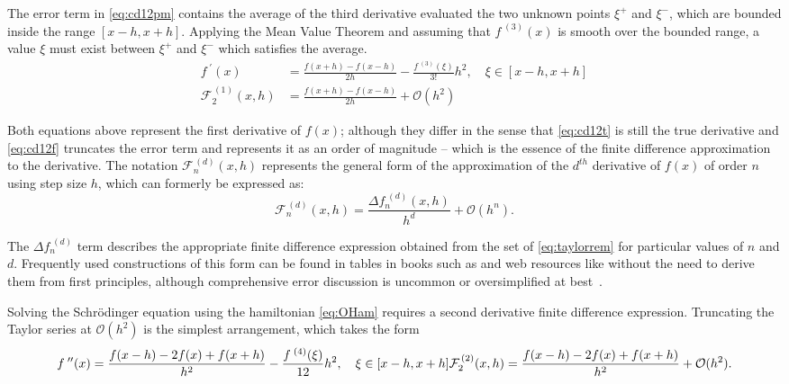 The error term in \cref{eq:cd12pm} contains the average of the third derivative evaluated the two unknown points $\xi^+$ and $\xi^-$, which are bounded inside the range $[x-h,x+h]$.
Applying the Mean Value Theorem and assuming that $f^{\;(3)}(x)$ is smooth over the bounded range, a value $\xi$ must exist between $\xi^+$ and $\xi^-$ which satisfies the average.
\begin{align}
f^{\;\prime}(x) &= \frac{f(x+h)-f(x-h)}{2h} - \frac{f^{\;(3)}(\xi)}{3!}h^2, \quad \xi \in [x-h,x+h]\label{eq:cd12t} \\
\mathcal{F}_2^{\,(1)}(x,h) &= \frac{f(x+h)-f(x-h)}{2h} + \mathcal{O}(h^2)\label{eq:cd12f}
\end{align}

Both equations above represent the first derivative of $f(x)$; although they differ in the sense that \cref{eq:cd12t} is still the true derivative and \cref{eq:cd12f} truncates the error term and represents it as an order of magnitude -- which is the essence of the finite difference approximation to the derivative.
The notation $\mathcal{F}_n^{\,(d)}(x,h)$ represents the general form of the approximation of the $d^{th}$ derivative of $f(x)$ of order $n$ using step size $h$, which can formerly be expressed as:
\begin{equation}
\mathcal{F}_n^{\,(d)}(x,h) = \frac{\Delta f_n^{\;(d)}(x,h)}{h^d} + \mathcal{O}(h^n).\label{eq:cdgeneral}
\end{equation}

The $\Delta f_n^{\;(d)}$ term describes the appropriate finite difference expression obtained from the set of \cref{eq:taylorrem} for particular values of $n$ and $d$.
Frequently used constructions of this form can be found in tables in books such as \citeauthor{Mathews2004} and web resources like \citeauthor{Holoborodko2009} without the need to derive them from first principles, although comprehensive error discussion is uncommon or oversimplified at best~\cite{Mathews2004,Holoborodko2009}.

Solving the Schr\"{o}dinger equation using the hamiltonian \cref{eq:OHam} requires a second derivative finite difference expression.
Truncating the Taylor series at $\mathcal{O}(h^2)$ is the simplest arrangement, which takes the form
\begin{equation}
f^{\;\prime\prime}(x) = \frac{f(x-h)-2f(x)+f(x+h)}{h^2} - \frac{f^{\;(4)}(\xi)}{12}h^2, \quad \xi \in [x-h,x+h]\label{eq:cd22t} \\
\mathcal{F}_2^{\,(2)}(x,h) = \frac{f(x-h)-2f(x)+f(x+h)}{h^2} + \mathcal{O}(h^2).\label{eq:cd22f}
\end{equation}

